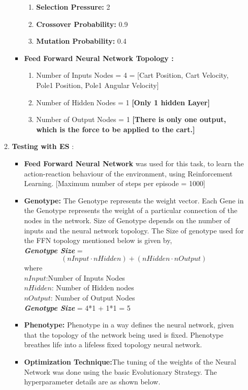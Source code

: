 \documentclass{article}
\begin{document}
\begin{itemize}
\begin{enumerate}
\begin{itemize}
\begin{enumerate}
	\item \textbf{Selection Pressure:} 2
	\item \textbf{Crossover Probability:} 0.9
	\item \textbf{Mutation Probability:} 0.4
	\end{enumerate}
	\item \textbf{Feed Forward Neural Network Topology :}
	\begin{enumerate}
	\item Number of Inputs Nodes = 4 = [Cart Position, Cart Velocity, Pole1 Position, Pole1 Angular Velocity]
	\item Number of Hidden Nodes = 1 \textbf{[Only 1 hidden Layer]}
	\item Number of Output Nodes = 1 \textbf{[There is only one output, which is the force to be applied to the cart.]}
	\end{enumerate}
	\end{itemize}
	\item \textbf{Testing with ES} :
	\begin{itemize}
	\item \textbf{Feed Forward Neural Network} was used for this task, to learn the action-reaction behaviour of the environment, using Reinforcement Learning. [Maximum number of steps per episode = 1000]
	\item \textbf{Genotype:} The Genotype represents the weight vector. Each Gene in the Genotype represents the weight of a particular connection of the nodes in the network. Size of Genotype depends on the number of inputs and the neural network topology. The Size of genotype used for the FFN topology mentioned below is given by, \\
    \textit{\textbf{Genotype Size}} = $$(nInput \cdot nHidden) + (nHidden \cdot nOutput)$$ where \\$nInput$:Number of Inputs Nodes\\$nHidden$: Number of Hidden nodes\\$nOutput$: Number of Output Nodes\\
	\textbf{\textit{Genotype Size}} = 4*1 + 1*1 = 5
	\item \textbf{Phenotype:} Phenotype in a way defines the neural network, given that the topology of the network being used is fixed. Phenotype breathes life into a lifeless fixed topology neural network.
	\item \textbf{Optimization Technique:}The tuning of the weights of the Neural Network was done using the basic Evolutionary Strategy. The hyperparameter details are as shown below.

\end{itemize}
\end{enumerate}
\end{itemize}
\end{document}
